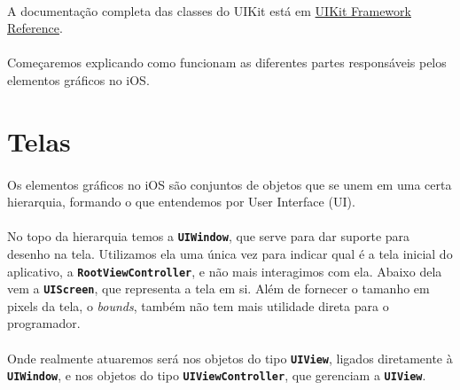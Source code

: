 \documentclass[a4paper,12pt,brazil,doubleside]{book}
\begin{document}
\paragraph{}A documentação completa das classes do UIKit está em 
\href{http://developer.apple.com/library/ios/#documentation/uikit/reference/UIKit_Framework/_index.html}{UIKit Framework Reference}.

\paragraph{}Começaremos explicando como funcionam as diferentes partes responsáveis pelos elementos gráficos no iOS.

\bigskip
\bigskip


\section{Telas}

\paragraph{}Os elementos gráficos no iOS são conjuntos de objetos que se unem em uma certa hierarquia, formando o que entendemos por User Interface (UI).
\paragraph{}No topo da hierarquia temos a \texttt{\textbf{UIWindow}}, que serve para dar suporte para desenho na tela. Utilizamos ela uma única vez para indicar qual é a tela inicial do aplicativo, a \texttt{\textbf{RootViewController}}, e não mais interagimos com ela. Abaixo dela vem a \texttt{\textbf{UIScreen}}, que representa a tela em si. Além de fornecer o tamanho em pixels da tela, o \emph{bounds}, também não tem mais utilidade direta para o programador.
\paragraph{}Onde realmente atuaremos será nos objetos do tipo \texttt{\textbf{UIView}}, ligados diretamente à \texttt{\textbf{UIWindow}}, e nos objetos do tipo \texttt{\textbf{UIViewController}}, que gerenciam a \texttt{\textbf{UIView}}.

\bigskip
\bigskip
\end{document}
